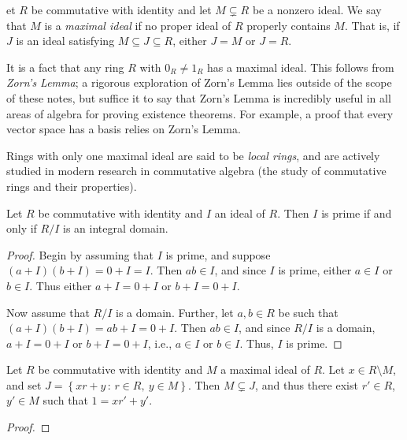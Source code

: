 \documentclass[english,course]{lecture}
\theoremstyle{plain}
\newenvironment{definition}[1]
  {\renewcommand\theinnerdefinition{#1}\innerdefinition}
  {\endinnerdefinition}
\def\setof#1#2{{\left\{#1\,\colon\,#2\right\}}}
\def\presnotes{}
\begin{document}



\begin{definition}
	Let $R$ be commutative with identity and let $M\subsetneq R$ be a nonzero ideal.
	We say that $M$ is a \emph{maximal ideal} if no proper ideal of $R$ properly contains $M$.
	That is, if $J$ is an ideal satisfying $M\subseteq J\subseteq R$, either $J=M$ or $J=R$.
\end{definition}

It is a fact that any ring $R$ with $0_R\ne 1_R$ has a maximal ideal.
This follows from \emph{Zorn's Lemma}; a rigorous exploration of Zorn's Lemma lies outside of the scope of these notes, but suffice it to say that Zorn's Lemma is incredibly useful in all areas of algebra for proving existence theorems. For example, a proof that every vector space has a basis relies on Zorn's Lemma.

Rings with only one maximal ideal are said to be \emph{local rings}, and are actively studied in modern research in commutative algebra (the study of commutative rings and their properties).

\begin{theorem}
	Let $R$ be commutative with identity and $I$ an ideal of $R$.
	Then $I$ is prime if and only if $R/I$ is an integral domain.
\end{theorem}

\begin{proof}
	Begin by assuming that $I$ is prime, and suppose $(a+I)(b+I) = 0+I = I$.
	Then $ab \in I$, and since $I$ is prime, either $a\in I$ or $b\in I$.
	Thus either $a+I = 0+I$ or $b+I = 0+I$.
	
	Now assume that $R/I$ is a domain.
	Further, let $a,b\in R$ be such that $(a+I)(b+I) = ab+I = 0+I$. 
	Then $ab\in I$, and since $R/I$ is a domain, $a+I = 0+I$ or $b+I = 0+I$, i.e., $a\in I$ or $b\in I$.
	Thus, $I$ is prime.
\end{proof}



\begin{lemma}
	Let $R$ be commutative with identity and $M$ a maximal ideal of $R$.
	Let $x\in R\setminus M$, and set $J = \setof{xr+y}{r\in R, \ y\in M}$.
	Then $M\subsetneq J$, and thus there exist $r'\in R$, $y'\in M$ such that $1 = xr'+y'$.
\end{lemma}

\begin{proof}
	
\end{proof}
\end{document}
